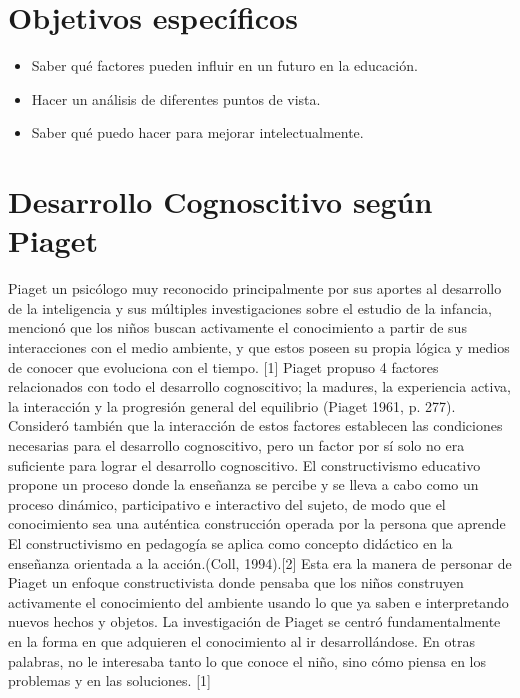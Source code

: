 \documentclass{bmcart}
\begin{document}
\section{Objetivos específicos}
\begin{itemize}
\item Saber qué factores pueden influir en un futuro en la educación.
\newline 
\item Hacer un análisis de diferentes puntos de vista.
\newline 
\item Saber qué puedo hacer para mejorar intelectualmente.
	\end{itemize}

\newpage
\section{Desarrollo Cognoscitivo según Piaget}
Piaget un psicólogo muy reconocido principalmente por sus aportes al desarrollo de la inteligencia y sus múltiples investigaciones sobre el estudio de la infancia, mencionó que los niños buscan activamente el conocimiento a partir de sus interacciones con el medio ambiente,  y que estos poseen su propia lógica y medios de conocer que evoluciona con el tiempo. [1] 
\newline
\newline
Piaget propuso 4 factores relacionados con todo el desarrollo cognoscitivo; la madures, la experiencia activa, la interacción y la progresión general del equilibrio (Piaget 1961, p. 277). Consideró también que la interacción de estos factores establecen las condiciones necesarias para el desarrollo cognoscitivo, pero un factor por sí solo no era suficiente para lograr el desarrollo cognoscitivo.
\newline
\newline
El constructivismo educativo propone un proceso donde la enseñanza se percibe y se lleva a cabo como un proceso dinámico, participativo e interactivo del sujeto, de modo que el conocimiento sea una auténtica construcción operada por la persona que aprende El constructivismo en pedagogía se aplica como concepto didáctico en la enseñanza orientada a la acción.(Coll, 1994).[2]
\newline
\newline
Esta era la manera de personar de Piaget un enfoque constructivista donde pensaba que  los niños  construyen  activamente el  conocimiento  del  ambiente usando lo  que  ya  saben  e  interpretando  nuevos  hechos y  objetos.  La  investigación  de Piaget se  centró  fundamentalmente  en  la  forma  en  que  adquieren  el  conocimiento  al  ir desarrollándose. En otras palabras, no le interesaba tanto lo que conoce el niño, sino cómo piensa  en  los  problemas  y  en  las  soluciones. [1]
\end{document}
